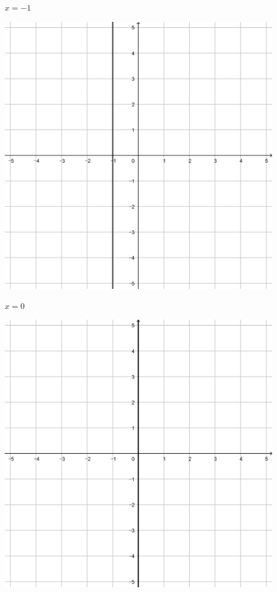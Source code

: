\documentclass[a4paper]{oblivoir}
\begin{document}
\clearpage
\begin{minipage}{0.45\textwidth}\centering
\(x=-1\)
\par\bigskip\includegraphics[width=0.9\textwidth]{img/6-1}
\end{minipage}
\begin{minipage}{0.45\textwidth}\centering
\(x=0\)
\par\bigskip\includegraphics[width=0.9\textwidth]{img/6-2}
\end{minipage}\bigskip\bigskip\par
\end{document}
